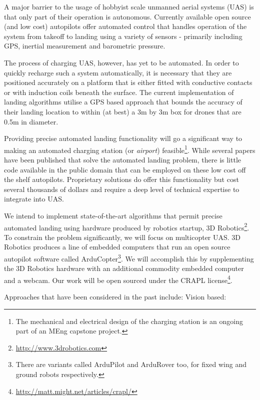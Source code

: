 A major barrier to the usage of hobbyist scale unmanned aerial systems (UAS) is that only part of their operation is autonomous. Currently available open source (and low cost) autopilots offer  automated control that handles operation of the system from takeoff to landing using a variety of sensors - primarily including GPS, inertial measurement and barometric pressure. 

The process of charging UAS, however, has yet to be automated. In order to quickly recharge such a system automatically, it is necessary that they are positioned accurately on a platform that is either fitted with conductive contacts or with induction coils beneath the surface. The current implementation of landing algorithms utilise a GPS based approach that bounds the accuracy of their landing location to within (at best) a 3m by 3m box for drones that are 0.5m in diameter. 

Providing precise automated landing functionality will go a significant way to making an automated charging station (or \textit{airport}) feasible\footnote{The mechanical and electrical design of the charging station is an ongoing part of an MEng capstone project.}. While several papers have been published that solve the automated landing problem, there is little code available in the public domain that can be employed on these low cost off the shelf autopilots. Proprietary solutions do offer this functionality but cost several thousands of dollars and require a deep level of technical expertise to integrate into UAS.

We intend to implement state-of-the-art algorithms that permit precise automated landing using hardware produced by robotics startup, 3D Robotics\footnote{\url{http://www.3drobotics.com}}. To constrain the problem significantly, we will focus on multicopter UAS. 3D Robotics produces a line of embedded computers that run an open source autopilot software called ArduCopter\footnote{There are variants called ArduPilot and ArduRover too, for fixed wing and ground robots respectively.}. We will accomplish this by supplementing the 3D Robotics hardware with an additional commodity embedded computer and a webcam. Our work will be open sourced under the CRAPL license\footnote{\url{http://matt.might.net/articles/crapl/}}.

Approaches that have been considered in the past include:
Vision based: 
\cite{simamitra2013} 
\cite{ginkel2013} 
\cite{saripalli2003experimental}
\cite{green2003autonomous}
\cite{merz2006autonomous}
\cite{garcia2002towards}
\cite{johnson2005vision}
\cite{saripalli2002vision}
